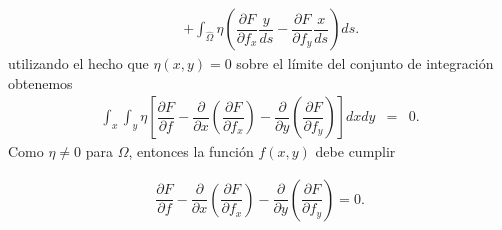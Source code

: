 \documentclass[11pt,letterpaper]{article}
\theoremstyle{definition}
\theoremstyle{definition}
\theoremstyle{definition}
\begin{document}
\begin{itemize}
\begin{eqnarray*}
	  &   & + \int_{\hat{\Omega}} \eta \left( \dfrac{\partial F}{\partial f_x} \dfrac{y}{ds} - \dfrac{\partial F}{\partial f_y} \dfrac{x}{ds} \right) ds.
\end{eqnarray*}
utilizando el hecho que $ \eta(x,y) = 0 $ sobre el límite del conjunto de integración obtenemos
\begin{eqnarray*}
	\int_x \int_y \eta \left[ \dfrac{\partial F}{\partial f} - \dfrac{\partial}{\partial x} \left( \dfrac{\partial F}{\partial f_x} \right)  - \dfrac{\partial}{\partial y} \left( \dfrac{\partial F}{\partial f_y} \right) \right] dx dy & = & 0.
\end{eqnarray*}
Como $ \eta \neq 0 $ para $ \Omega $, entonces la función $ f(x,y) $ debe cumplir
\begin{shaded*}
	\begin{eqnarray}
		\dfrac{\partial F}{\partial f} - \dfrac{\partial}{\partial x} \left( \dfrac{\partial F}{\partial f_x} \right)  - \dfrac{\partial}{\partial y} \left( \dfrac{\partial F}{\partial f_y} \right) = 0.
	\end{eqnarray}
\end{shaded*}
\end{itemize}
\end{document}
